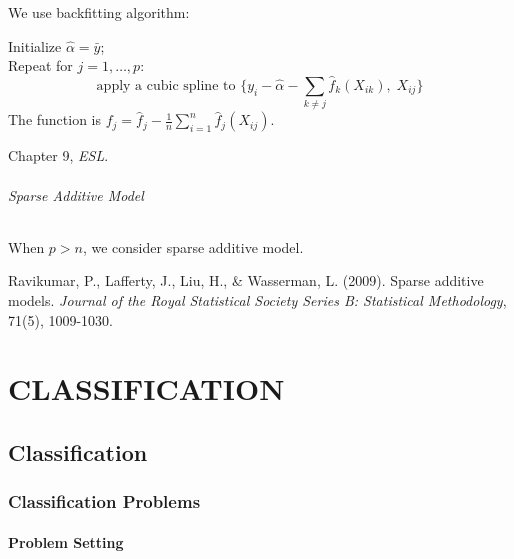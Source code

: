 \documentclass[12pt]{book}
\theoremstyle{definition}
\theoremstyle{remark}
\begin{document}
We use backfitting algorithm: \\

\begin{notionbox}
Initialize $\hat{\alpha} = \bar{y}$;\\
Repeat for $j=1,\dots,p$:\\
\[\text{apply a cubic spline to } \{y_i - \hat{\alpha} - \sum_{k\ne j }\hat{f}_k(X_{ik}),\;X_{ij}\}\]
The function is $f_j = \hat{f}_j - \frac1n\sum_{i=1}^n\hat{f}_j(X_{ij})$.
\end{notionbox}


\begin{referencebox}
    Chapter 9, \textit{ESL}.
\end{referencebox}



\paragraph{Sparse Additive Model}

When $p>n$, we consider sparse additive model.\\

\begin{referencebox}
    Ravikumar, P., Lafferty, J., Liu, H., \& Wasserman, L. (2009). Sparse additive models. \textit{Journal of the Royal Statistical Society Series B: Statistical Methodology}, 71(5), 1009-1030.
\end{referencebox}
















\part{CLASSIFICATION}
\chapter{Classification}
\section{Classification Problems}
\subsection{Problem Setting}
\end{document}
